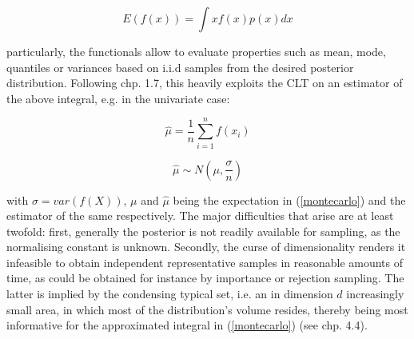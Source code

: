 \documentclass[11pt]{article}
\begin{document}
        \begin{equation}\label{montecarlo}
            E(f(x)) = \int x f(x) p(x) dx
        \end{equation}

        particularly, the functionals allow to evaluate properties such as mean, mode, quantiles or variances based on i.i.d samples from the desired posterior distribution. Following \citep{brooks2011handbook} chp. 1.7, this heavily exploits the CLT on an estimator of the above integral, e.g. in the univariate case:

        \begin{equation}
            \hat{\mu} = \frac{1}{n}\sum_{i=1}^n f(x_i)
        \end{equation}

        \begin{equation} \label{clt}
            \hat{\mu} \sim N\left(\mu, \frac{\sigma}{n}\right)
        \end{equation}

        with $\sigma = var(f(X))$, $\mu$ and $\hat{\mu}$ being the expectation in (\ref{montecarlo}) and the  estimator of the same respectively.
        The major difficulties that arise are at least twofold: first, generally the posterior is not readily available for sampling, as the normalising constant is unknown. Secondly, the curse of dimensionality renders it infeasible to obtain independent representative samples in reasonable amounts of time, as could be obtained for instance by importance or rejection sampling. The latter is implied by the condensing typical set, i.e. an in dimension $d$ increasingly small area, in which most of the distribution's volume resides, thereby being most informative for the approximated integral in (\ref{montecarlo}) (see \citep{mackay2003information} chp. 4.4).
\end{document}
